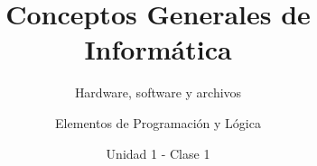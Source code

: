 \documentclass[usenames,dvipsnames]{../../common/beamerUNQaccessible}
\title{Conceptos Generales de Informática}
\subtitle{Hardware, software y archivos}
\author{Elementos de Programación y Lógica}
\date{Unidad 1 - Clase 1}
\begin{document}
  \titleframe
  \toc
  
  \finaltitleframe
\end{document}
